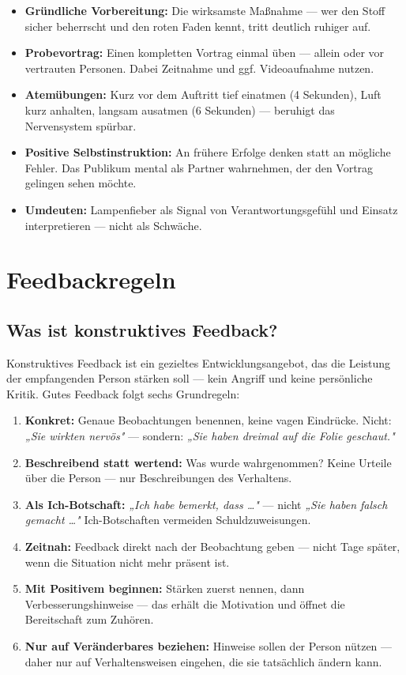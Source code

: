 \documentclass[11pt, a4paper]{article}
\begin{document}
\begin{itemize}
  \item \textbf{Gründliche Vorbereitung:} Die wirksamste Maßnahme --- wer den Stoff sicher
        beherrscht und den roten Faden kennt, tritt deutlich ruhiger auf.
  \item \textbf{Probevortrag:} Einen kompletten Vortrag einmal üben --- allein oder vor
        vertrauten Personen. Dabei Zeitnahme und ggf. Videoaufnahme nutzen.
  \item \textbf{Atemübungen:} Kurz vor dem Auftritt tief einatmen (4 Sekunden), Luft kurz
        anhalten, langsam ausatmen (6 Sekunden) --- beruhigt das Nervensystem spürbar.
  \item \textbf{Positive Selbstinstruktion:} An frühere Erfolge denken statt an mögliche Fehler.
        Das Publikum mental als Partner wahrnehmen, der den Vortrag gelingen sehen möchte.
  \item \textbf{Umdeuten:} Lampenfieber als Signal von Verantwortungsgefühl und Einsatz
        interpretieren --- nicht als Schwäche.
\end{itemize}

\section{Feedbackregeln}

\subsection{Was ist konstruktives Feedback?}

Konstruktives Feedback ist ein gezieltes Entwicklungsangebot, das die Leistung der empfangenden
Person stärken soll --- kein Angriff und keine persönliche Kritik.
Gutes Feedback folgt sechs Grundregeln:

\begin{enumerate}
  \item \textbf{Konkret:} Genaue Beobachtungen benennen, keine vagen Eindrücke.
        Nicht: \emph{„Sie wirkten nervös"} --- sondern: \emph{„Sie haben dreimal auf die Folie
        geschaut."}
  \item \textbf{Beschreibend statt wertend:} Was wurde wahrgenommen?
        Keine Urteile über die Person --- nur Beschreibungen des Verhaltens.
  \item \textbf{Als Ich-Botschaft:} \emph{„Ich habe bemerkt, dass \ldots"} --- nicht
        \emph{„Sie haben falsch gemacht \ldots"} Ich-Botschaften vermeiden Schuldzuweisungen.
  \item \textbf{Zeitnah:} Feedback direkt nach der Beobachtung geben ---
        nicht Tage später, wenn die Situation nicht mehr präsent ist.
  \item \textbf{Mit Positivem beginnen:} Stärken zuerst nennen, dann Verbesserungshinweise ---
        das erhält die Motivation und öffnet die Bereitschaft zum Zuhören.
  \item \textbf{Nur auf Veränderbares beziehen:} Hinweise sollen der Person nützen ---
        daher nur auf Verhaltensweisen eingehen, die sie tatsächlich ändern kann.
\end{enumerate}
\end{document}
